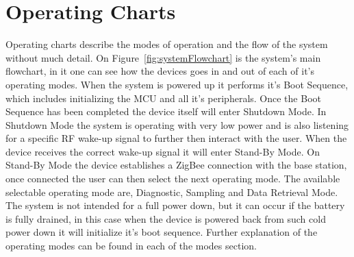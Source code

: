 \section{Operating Charts}
Operating charts describe the modes of operation and the flow of the system without much detail. On Figure~\ref{fig:systemFlowchart} is the system's main flowchart, in it one can see how the devices goes in and out of each of it's operating modes. When the system is powered up it performs it's Boot Sequence, which includes initializing the MCU and all it's peripherals. Once the Boot Sequence has been completed the device itself will enter Shutdown Mode. In Shutdown Mode the system is operating with very low power and is also listening for a specific RF wake-up signal to further then interact with the user. When the device receives the correct wake-up signal it will enter Stand-By Mode. On Stand-By Mode the device establishes a ZigBee connection with the base station, once connected the user can then select the next operating mode. The available selectable operating mode are, Diagnostic, Sampling and Data Retrieval Mode. The system is not intended for a full power down, but it can occur if the battery is fully drained, in this case when the device is powered back from such cold power down it will initialize it's boot sequence. Further explanation of the operating modes can be found in each of the modes section.
